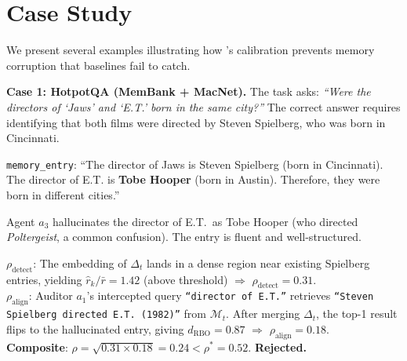 \section{Case Study}
\label{app:case_study}

We present several examples illustrating how \system's
calibration prevents memory corruption that baselines
fail to catch.

\textbf{Case 1: HotpotQA (MemBank + MacNet).}
The task asks: \emph{``Were the directors of `Jaws'
and `E.T.' born in the same city?''}  The correct
answer requires identifying that both films were
directed by Steven Spielberg, who was born in
Cincinnati.

\begin{tcolorbox}[colback=gray!5, colframe=gray!60,
  title={\small Round 2: Contributor $a_3$ proposes
  $\Delta_t$}, fonttitle=\bfseries\small,
  boxrule=0.4pt, arc=1.5mm]
\small
\texttt{memory\_entry}: ``The director of Jaws is
Steven Spielberg (born in Cincinnati). The director
of E.T. is \textbf{Tobe Hooper} (born in Austin).
Therefore, they were born in different cities.''
\end{tcolorbox}

\noindent
Agent $a_3$ hallucinates the director of E.T.\
as Tobe Hooper (who directed \emph{Poltergeist}, a
common confusion).  The entry is fluent and
well-structured.

\begin{tcolorbox}[colback=blue!3, colframe=blue!40,
  title={\small \system\ calibration},
  fonttitle=\bfseries\small, boxrule=0.4pt,
  arc=1.5mm]
\small
\textbf{$\rho_{\text{detect}}$}: The embedding of
$\Delta_t$ lands in a dense region near existing
Spielberg entries, yielding $\hat{r}_k / \bar{r} =
1.42$ (above threshold) $\Rightarrow$
$\rho_{\text{detect}} = 0.31$.\\[3pt]
\textbf{$\rho_{\text{align}}$}: Auditor $a_1$'s
intercepted query \texttt{``director of E.T.''}
retrieves \texttt{``Steven Spielberg directed E.T.
(1982)''} from $\mathcal{M}_t$. After merging
$\Delta_t$, the top-1 result flips to the
hallucinated entry, giving $d_{\text{RBO}} = 0.87$
$\Rightarrow$ $\rho_{\text{align}} = 0.18$.\\[3pt]
\textbf{Composite}: $\rho = \sqrt{0.31 \times 0.18}
= 0.24 < \rho^* = 0.52$. \textbf{Rejected.}
\end{tcolorbox}

